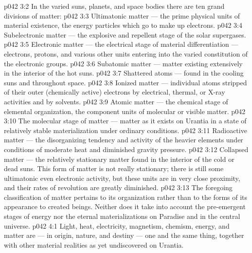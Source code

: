 \vs p042 3:2 In the varied suns, planets, and space bodies there are ten grand divisions of matter:
\vs p042 3:3 \pc {}\bibnobreakspace Ultimatonic matter --- the prime physical units of material existence, the energy particles which go to make up electrons.
\vs p042 3:4 \pc {}\bibnobreakspace Subelectronic matter --- the explosive and repellent stage of the solar supergases.
\vs p042 3:5 \pc {}\bibnobreakspace Electronic matter --- the electrical stage of material differentiation --- electrons, protons, and various other units entering into the varied constitution of the electronic groups.
\vs p042 3:6 \pc {}\bibnobreakspace Subatomic matter --- matter existing extensively in the interior of the hot suns.
\vs p042 3:7 \pc {}\bibnobreakspace Shattered atoms --- found in the cooling suns and throughout space.
\vs p042 3:8 \pc {}\bibnobreakspace Ionized matter --- individual atoms stripped of their outer (chemically active) electrons by electrical, thermal, or X\hyp{}ray activities and by solvents.
\vs p042 3:9 \pc {}\bibnobreakspace Atomic matter --- the chemical stage of elemental organization, the component units of molecular or visible matter.
\vs p042 3:10 \pc {}\bibnobreakspace The molecular stage of matter --- matter as it exists on Urantia in a state of relatively stable materialization under ordinary conditions.
\vs p042 3:11 \pc {}\bibnobreakspace Radioactive matter --- the disorganizing tendency and activity of the heavier elements under conditions of moderate heat and diminished gravity pressure.
\vs p042 3:12 \pc {}\bibnobreakspace Collapsed matter --- the relatively stationary matter found in the interior of the cold or dead suns. This form of matter is not really stationary; there is still some ultimatonic even electronic activity, but these units are in very close proximity, and their rates of revolution are greatly diminished.
\vs p042 3:13 \pc The foregoing classification of matter pertains to its organization rather than to the forms of its appearance to created beings. Neither does it take into account the pre\hyp{}emergent stages of energy nor the eternal materializations on Paradise and in the central universe.
\vs p042 4:1 Light, heat, electricity, magnetism, chemism, energy, and matter are --- in origin, nature, and destiny --- one and the same thing, together with other material realities as yet undiscovered on Urantia.
